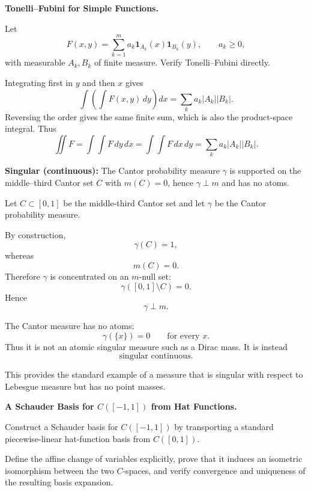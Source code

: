 \begin{problem}[CP-II-0164]
\label{prob:cp-ii-0164}
\textbf{Tonelli--Fubini for Simple Functions.}

\hspace*{1.5em}Let
\[
F(x,y)=\sum_{k=1}^m a_k\mathbf1_{A_k}(x)\mathbf1_{B_k}(y),\qquad a_k\ge0,
\]
with measurable \(A_k,B_k\) of finite measure. Verify Tonelli--Fubini directly.
\end{problem}

\begin{solution}
Integrating first in \(y\) and then \(x\) gives
\[
\int\!\left(\int F(x,y)\,dy\right)dx=\sum_k a_k|A_k||B_k|.
\]
Reversing the order gives the same finite sum, which is also the product-space integral. Thus
\[
\boxed{\iint F=\int\!\int F\,dy\,dx=\int\!\int F\,dx\,dy=\sum_k a_k|A_k||B_k|.}
\]
\end{solution}


\begin{problem}[CP-II-0165]
\label{prob:cp-ii-0165}
\textbf{Singular (continuous):}
		The Cantor probability measure $\gamma$ is supported on the middle--third Cantor set $C$ with $m(C)=0$,
		hence $\gamma\perp m$ and has no atoms.
\end{problem}

\begin{solution}
Let \(C\subset[0,1]\) be the middle-third Cantor set and let \(\gamma\) be the Cantor
probability measure.

By construction,
\[
\gamma(C)=1,
\]
whereas
\[
m(C)=0.
\]
Therefore \(\gamma\) is concentrated on an \(m\)-null set:
\[
\gamma([0,1]\setminus C)=0.
\]
Hence
\[
\boxed{\gamma\perp m.}
\]

The Cantor measure has no atoms:
\[
\gamma(\{x\})=0
\qquad
\text{for every }x.
\]
Thus it is not an atomic singular measure such as a Dirac mass. It is instead
\[
\boxed{\text{singular continuous}.}
\]

This provides the standard example of a measure that is singular with respect to Lebesgue
measure but has no point masses.
\end{solution}


\begin{problem}[CP-II-0167]
\label{prob:cp-ii-0167}
\textbf{A Schauder Basis for \(C([-1,1])\) from Hat Functions.}

\hspace*{1.5em}Construct a Schauder basis for \(C([-1,1])\) by transporting a standard
piecewise-linear hat-function basis from \(C([0,1])\).

Define the affine change of variables explicitly, prove that it induces an
isometric isomorphism between the two \(C\)-spaces, and verify convergence and
uniqueness of the resulting basis expansion.
\end{problem}

